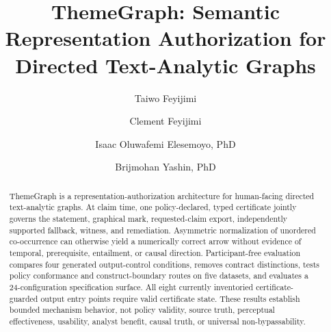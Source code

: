 \documentclass[manuscript,screen,review]{acmart}
\begin{document}
\title{ThemeGraph: Semantic Representation Authorization for Directed Text-Analytic Graphs}

\author{Taiwo Feyijimi}

\author{Clement Feyijimi}

\author{Isaac Oluwafemi Elesemoyo, PhD}

\author{Brijmohan Yashin, PhD}

\begin{abstract}
ThemeGraph is a representation-authorization architecture for human-facing directed text-analytic graphs. At claim time, one policy-declared, typed certificate jointly governs the statement, graphical mark, requested-claim export, independently supported fallback, witness, and remediation. Asymmetric normalization of unordered co-occurrence can otherwise yield a numerically correct arrow without evidence of temporal, prerequisite, entailment, or causal direction. Participant-free evaluation compares four generated output-control conditions, removes contract distinctions, tests policy conformance and construct-boundary routes on five datasets, and evaluates a 24-configuration specification surface. All eight currently inventoried certificate-guarded output entry points require valid certificate state. These results establish bounded mechanism behavior, not policy validity, source truth, perceptual effectiveness, usability, analyst benefit, causal truth, or universal non-bypassability.
\end{abstract}
\end{document}

